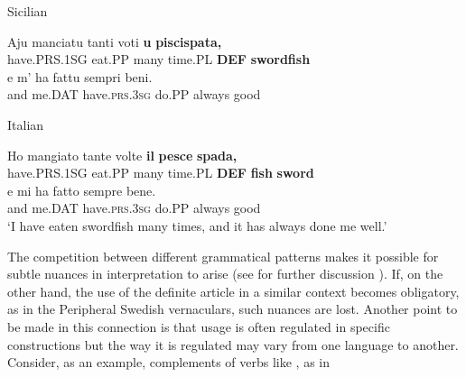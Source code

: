 Sicilian



 \ea\label{}
\gll Aju  manciatu  tanti  voti  \textbf{u} \textbf{piscispata,}\\


have.PRS.1SG  eat.PP  many  time.PL  \textbf{DEF} \textbf{swordfish}\\

 \ea\label{}
\gll e  m’  ha  fattu  sempri  beni.\\


and  me.DAT  have.\textsc{prs.3sg}  do.PP  always  good\\

\item 

Italian



 \ea\label{}
\gll Ho  mangiato  tante  volte  \textbf{il} \textbf{pesce} \textbf{spada,}\\


have.PRS.1SG  eat.PP  many  time.PL  \textbf{DEF} \textbf{fish} \textbf{sword}\\

 \ea\label{}
\gll e  mi  ha  fatto  sempre  bene.\\


and  me.DAT  have.\textsc{prs.3sg}  do.PP  always  good\\

\glt ‘I have eaten swordfish many times, and it has always done me well.’

\z

The competition between different grammatical patterns makes it possible for subtle nuances in interpretation to arise (see for further discussion \citet[128-134]{Dahl2004}). If, on the other hand, the use of the definite article in a similar context becomes obligatory, as in the Peripheral Swedish vernaculars, such nuances are lost. Another point to be made in this connection is that usage is often regulated in specific constructions but the way it is regulated may vary from one language to another. Consider, as an example, complements of verbs like , as in

